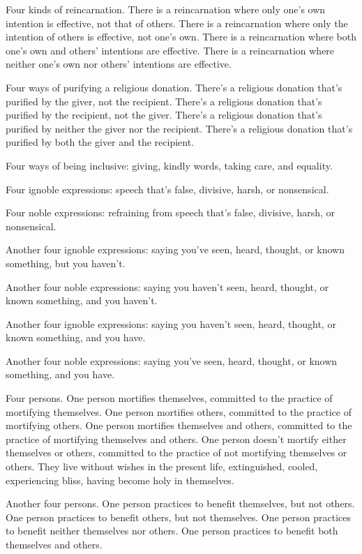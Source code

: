 \documentclass[12pt,openany]{book}%
\begin{document}
Four kinds of reincarnation. There is a reincarnation where only one’s own intention is effective, not that of others. There is a reincarnation where only the intention of others is effective, not one’s own. There is a reincarnation where both one’s own and others’ intentions are effective. There is a reincarnation where neither one’s own nor others’ intentions are effective. 

Four ways of purifying a religious donation. There’s a religious donation that’s purified by the giver, not the recipient. There’s a religious donation that’s purified by the recipient, not the giver. There’s a religious donation that’s purified by neither the giver nor the recipient. There’s a religious donation that’s purified by both the giver and the recipient. 

Four ways of being inclusive: giving, kindly words, taking care, and equality. 

Four ignoble expressions: speech that’s false, divisive, harsh, or nonsensical. 

Four noble expressions: refraining from speech that’s false, divisive, harsh, or nonsensical. 

Another four ignoble expressions: saying you’ve seen, heard, thought, or known something, but you haven’t. 

Another four noble expressions: saying you haven’t seen, heard, thought, or known something, and you haven’t. 

Another four ignoble expressions: saying you haven’t seen, heard, thought, or known something, and you have. 

Another four noble expressions: saying you’ve seen, heard, thought, or known something, and you have. 

Four persons. One person mortifies themselves, committed to the practice of mortifying themselves. One person mortifies others, committed to the practice of mortifying others. One person mortifies themselves and others, committed to the practice of mortifying themselves and others. One person doesn’t mortify either themselves or others, committed to the practice of not mortifying themselves or others. They live without wishes in the present life, extinguished, cooled, experiencing bliss, having become holy in themselves. 

Another four persons. One person practices to benefit themselves, but not others. One person practices to benefit others, but not themselves. One person practices to benefit neither themselves nor others. One person practices to benefit both themselves and others. 
\end{document}
